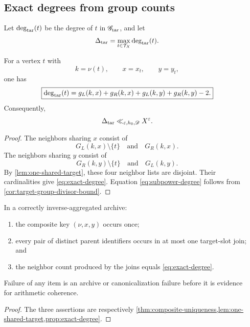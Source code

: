 \subsection{Exact degrees from group counts}

Let \(\deg_{\mathrm{tar}}(t)\) be the degree of \(t\) in
\(\mathscr G_{\mathrm{tar}}\), and let
\[
 \Delta_{\mathrm{tar}}=\max_{t\in\mathcal T_X}\deg_{\mathrm{tar}}(t).
\]

\begin{proposition}
\label{prop:exact-degree}
For a vertex \(t\) with
\[
 k=\nu(t),\qquad x=x_t,\qquad y=y_t,
\]
one has
\begin{equation}
 \boxed{
 \deg_{\mathrm{tar}}(t)
 =
 g_L(k,x)+g_R(k,x)
 +g_L(k,y)+g_R(k,y)-2.}
\label{eq:exact-degree}
\end{equation}
Consequently,
\begin{equation}
 \Delta_{\mathrm{tar}}\ll_{\varepsilon,h_0,\mathscr D}X^\varepsilon.
\label{eq:subpower-degree}
\end{equation}
\end{proposition}

\begin{proof}
The neighbors sharing \(x\) consist of
\[
 G_L(k,x)\setminus\{t\}
 \quad\text{and}\quad
 G_R(k,x).
\]
The neighbors sharing \(y\) consist of
\[
 G_R(k,y)\setminus\{t\}
 \quad\text{and}\quad
 G_L(k,y).
\]
By \cref{lem:one-shared-target}, these four neighbor lists are
disjoint.  Their cardinalities give \eqref{eq:exact-degree}.
Equation \eqref{eq:subpower-degree} follows from
\cref{cor:target-group-divisor-bound}.
\end{proof}

\begin{corollary}
\label{cor:composite-audit}
In a correctly inverse-aggregated archive:
\begin{enumerate}[label=(\roman*),leftmargin=2.2em]
\item the composite key \((\nu,x,y)\) occurs once;
\item every pair of distinct parent identifiers occurs in at most one
  target-slot join; and
\item the neighbor count produced by the joins equals
  \eqref{eq:exact-degree}.
\end{enumerate}
Failure of any item is an archive or canonicalization failure before
it is evidence for arithmetic coherence.
\end{corollary}

\begin{proof}
The three assertions are respectively
\cref{thm:composite-uniqueness,lem:one-shared-target,prop:exact-degree}.
\end{proof}

